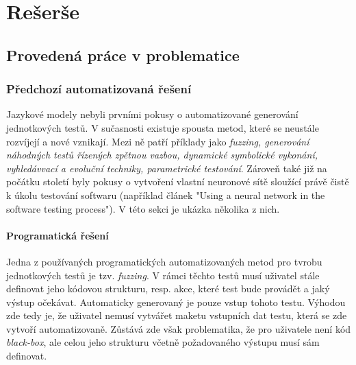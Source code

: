 \documentclass[czech, ma, kiv, he, iso690alph, pdf, viewonly]{fasthesis}
\begin{document}
\chapter{Rešerše} \label{sec:research}

    \section{Provedená práce v problematice} \label{sec:previouswork}
        \subsection{Předchozí automatizovaná řešení}
        Jazykové modely nebyli prvními pokusy o automatizované generování jednotkových testů. V sučasnosti existuje spousta metod, které se neustále rozvíjejí a nové vznikají. Mezi ně patří příklady jako \textit{fuzzing, generování náhodných testů řízených zpětnou vazbou, dynamické symbolické vykonání, vyhledávvací a evoluční techniky, parametrické testování}. Zároveň také již na počátku století byly pokusy o vytvoření vlastní neuronové sítě sloužící právě čistě k úkolu testování softwaru (například článek "Using a neural network in the software testing process"). \cite{Vanmali2002UsingAN} V této sekci je ukázka několika z nich. 

        \subsubsection{Programatická řešení}
        Jedna z používaných programatických automatizovaných metod pro tvrobu jednotkových testů je tzv. \textit{fuzzing}. V rámci těchto testů musí uživatel stále definovat jeho kódovou strukturu, resp. akce, které test bude provádět a jaký výstup očekávat. Automaticky generovaný je pouze vstup tohoto testu. Výhodou zde tedy je, že uživatel nemusí vytvářet maketu vstupních dat testu, která se zde vytvoří automatizovaně. Zůstává zde však problematika, že pro uživatele není kód \emph{black-box}, ale celou jeho strukturu včetně požadovaného výstupu musí sám definovat. \cite{fuzzing}
\end{document}
